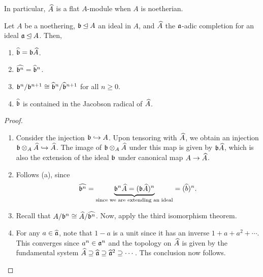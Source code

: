 \begin{corollary}
    In particular, $\widehat{A}$ is a flat $A$-module when $A$ is noetherian.
\end{corollary}

\begin{proposition}
    Let $A$ be a noethering, $\mathfrak b\unlhd A$ an ideal in $A$, and $\widehat{A}$ the $\mathfrak a$-adic completion for an ideal $\mathfrak a\unlhd A$. Then, 
    \begin{enumerate}[label=(\alph*)]
        \item $\widehat{\mathfrak b} = \mathfrak b\widehat{A}$. 
        \item $\widehat{\mathfrak b^n} = \widehat{\mathfrak b}^n$. 
        \item $\mathfrak b^n/\mathfrak b^{n + 1}\cong\widehat{\mathfrak b}^n/\widehat{\mathfrak b}^{n + 1}$ for all $n\ge 0$. 
        \item $\widehat{\mathfrak b}$ is contained in the Jacobson radical of $\widehat{A}$.
    \end{enumerate}
\end{proposition}
\begin{proof}
\begin{enumerate}[label=(\alph*)]
    \item Consider the injection $\mathfrak b\hookrightarrow A$. Upon tensoring with $\widehat{A}$, we obtain an injection $\mathfrak b\otimes_A\widehat{A}\hookrightarrow\widehat{A}$. The image of $\mathfrak b\otimes_A\widehat{A}$ under this map is given by $\mathfrak b\widehat{A}$, which is also the extension of the ideal $\mathfrak b$ under canonical map $A\to\widehat{A}$.

    \item Follows (a), since 
    \begin{equation*}
        \widehat{\mathfrak b^n} = \underbrace{\mathfrak b^n\widehat{A} = (\mathfrak b\widehat{A})^n}_{\text{since we are extending an ideal}} = (\widehat{b})^n.
    \end{equation*}

    \item Recall that $A/\mathfrak b^n\cong\widehat{A}/\widehat{\mathfrak b^n}$. Now, apply the third isomorphism theorem. 
    
    \item For any $a\in\widehat{\mathfrak a}$, note that $1 - a$ is a unit since it has an inverse $1 + a + a^2 + \cdots$. This converges since $a^n\in\mathfrak a^n$ and the topology on $\widehat{A}$ is given by the fundamental system $\widehat{A}\supseteq\widehat{\mathfrak a}\supseteq\widehat{\mathfrak a}^2\supseteq\cdots$. Ths conclusion now follows.\qedhere
\end{enumerate}
\end{proof}

